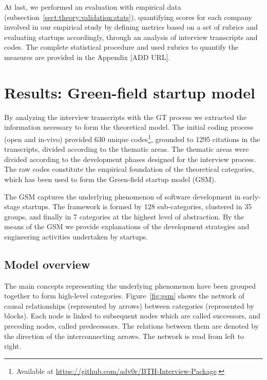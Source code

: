 \documentclass[10pt,journal,letterpaper,compsoc]{IEEEtran}
\begin{document}
At last, we performed an evaluation with empirical data 
(subsection~\ref{sect:theory:validation:stats}), quantifying scores for each 
company involved in our empirical study by defining metrics based on a set of 
rubrics and evaluating startups accordingly, through an analysis of interview
transcripts and codes. The complete statistical procedure and used rubrics
to quantify the measures are provided in the Appendix [ADD URL].


\section{Results: Green-field startup model}\label{res:gsm}

By analyzing the interview transcripts with the GT process we extracted the
information necessary to form the theoretical model. The initial coding process
(open and in-vivo) provided 630 unique codes\footnote{Available at
\url{https://github.com/adv0r/BTH-Interview-Package}.}, grounded to 1295
citations in the transcripts, divided according to the thematic areas. The
thematic areas were divided according to the development phases designed for the
interview process. The raw codes constitute the empirical foundation of the
theoretical categories, which has been used to form the Green-field startup
model (GSM).

The GSM captures the underlying phenomenon of software development in 
early-stage startups. The framework is formed by 128 sub-categories, clustered 
in 35 groups, and finally in 7 categories at the highest level of abstraction. 
By the means of the GSM we provide explanations of the development strategies 
and engineering activities undertaken by startups.

\subsection{Model overview} \label{res:gsm:frmov} 
The main concepts representing the underlying phenomenon have been grouped 
together to form high-level categories. Figure~\ref{fig:gsm} shows the network 
of causal relationships (represented by arrows) between categories (represented 
by blocks). Each node is linked to subsequent nodes which are called successors,
and preceding nodes, called predecessors. The relations between them are denoted
by the direction of the interconnecting arrows. The network is read from left to
right.
\end{document}
